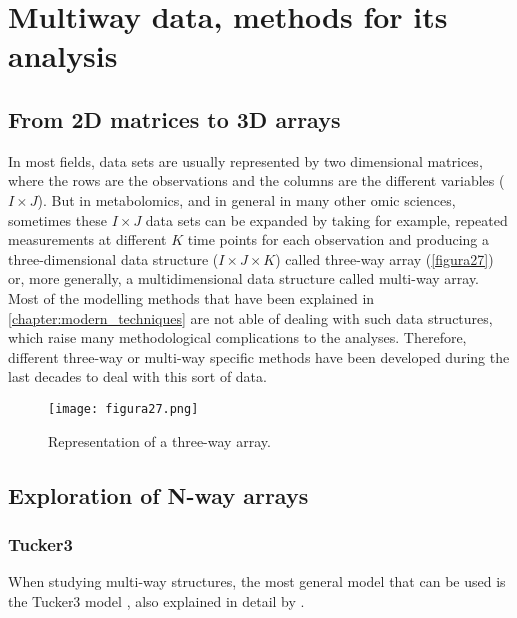 
\chapter[Multiway data, methods for its analysis]{Multiway data, methods for its analysis}
\label{chapter:threeways}


\section{From 2D matrices to 3D arrays}
In most fields, data sets are usually represented by two dimensional matrices, where the rows are the observations and the columns are the different variables ($I \times J$). But in metabolomics, and in general in many other omic sciences, sometimes these $I \times J$ data sets can be expanded by taking for example, repeated measurements at different $K$ time points for each observation and producing a three-dimensional data structure ($I \times J \times K$) called three-way array (\autoref{figura27}) or, more generally, a multidimensional data structure called multi-way array. Most of the modelling methods that have been explained in \autoref{chapter:modern_techniques} are not able of dealing with such data structures, which raise many methodological complications to the analyses. Therefore, different three-way or multi-way specific methods have been developed during the last decades to deal with this sort of data.

\begin{figure}[hbtp]
\centering
\texttt{[image: figura27.png]}
\caption{Representation of a three-way array.}
\label{figura27}
\end{figure}

\section{Exploration of N-way arrays}
\subsection{Tucker3}
When studying multi-way structures, the most general model that can be used is the Tucker3 model \parencite{tucker1966some}, also explained in detail by \cite{kiers2001three}.

